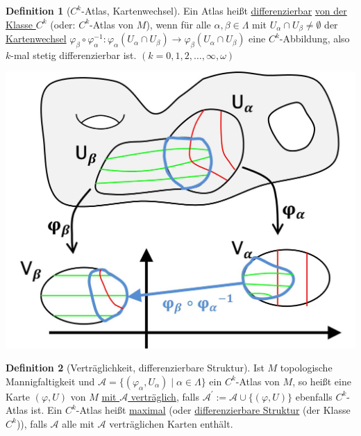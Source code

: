 \documentclass[a4paper,11pt,notitlepage]{report}
\theoremstyle{remark}
\theoremstyle{definition}
\newtheorem{definition}{Definition}[chapter]
\begin{document}
\begin{definition}[$C^k$-Atlas, Kartenwechsel]
	Ein Atlas heißt \underline{differenzierbar} \underline{von der Klasse $C^k$} (oder: $C^k$-Atlas von $M$), wenn für alle $\alpha, \beta \in \Lambda$ mit $U_\alpha \cap U_\beta \neq \emptyset$ der \underline{Kartenwechsel} $\varphi_\beta \circ \varphi_\alpha^{-1} \colon \varphi_\alpha(U_\alpha \cap U_\beta) \rightarrow \varphi_\beta(U_\alpha \cap U_\beta)$ eine $C^k$-Abbildung, also $k$-mal stetig differenzierbar ist. $(k=0,1,2,\ldots,\infty,\omega)$
	\newline
\end{definition}
\begin{center}
	\includegraphics[scale=0.4]{images/Kartenwechsel.jpg}
\end{center} 
 
\begin{definition}[Verträglichkeit, differenzierbare Struktur]
	Ist $M$ topologische Mannigfaltigkeit und $\mathcal{A}=\{(\varphi_\alpha,U_\alpha) \mid \alpha \in \Lambda\}$ ein $C^k$-Atlas von $M$, so heißt eine Karte $(\varphi,U)$ von $M$ \underline{mit $\mathcal{A}$ verträglich}, falls $\mathcal{A}^\prime := \mathcal{A} \cup \{(\varphi,U)\}$ ebenfalls $C^k$-Atlas ist. 
	Ein $C^k$-Atlas heißt \underline{maximal} (oder \underline{differenzierbare Struktur} (der Klasse $C^k$)), falls $\mathcal{A}$ alle mit $\mathcal{A}$ verträglichen Karten enthält.
\end{definition} 
\end{document}
